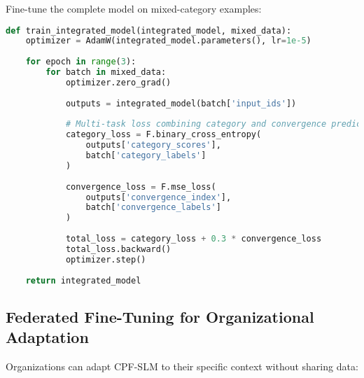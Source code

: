 \documentclass[11pt,a4paper]{article}
\begin{document}
Fine-tune the complete model on mixed-category examples:

\begin{lstlisting}[language=Python, caption=End-to-End Training]
def train_integrated_model(integrated_model, mixed_data):
    optimizer = AdamW(integrated_model.parameters(), lr=1e-5)
    
    for epoch in range(3):
        for batch in mixed_data:
            optimizer.zero_grad()
            
            outputs = integrated_model(batch['input_ids'])
            
            # Multi-task loss combining category and convergence predictions
            category_loss = F.binary_cross_entropy(
                outputs['category_scores'], 
                batch['category_labels']
            )
            
            convergence_loss = F.mse_loss(
                outputs['convergence_index'],
                batch['convergence_labels']
            )
            
            total_loss = category_loss + 0.3 * convergence_loss
            total_loss.backward()
            optimizer.step()
    
    return integrated_model
\end{lstlisting}

\subsection{Federated Fine-Tuning for Organizational Adaptation}

Organizations can adapt CPF-SLM to their specific context without sharing data:
\end{document}
